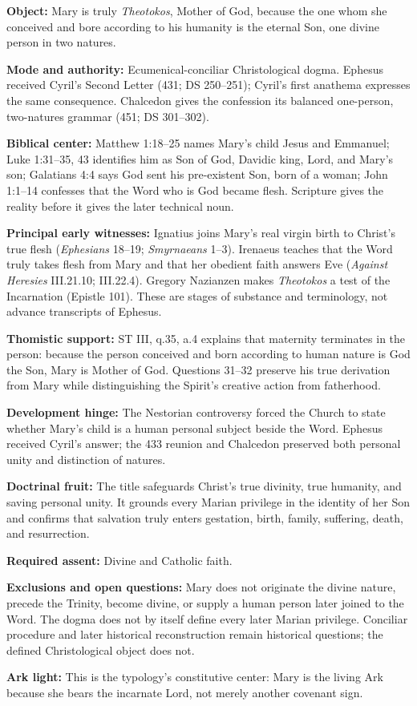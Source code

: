\begingroup
\small
\begin{studyframe}
\textbf{Object:} Mary is truly \emph{Theotokos}, Mother of God, because the
one whom she conceived and bore according to his humanity is the eternal Son,
one divine person in two natures.\par
\textbf{Mode and authority:} Ecumenical-conciliar Christological dogma.
Ephesus received Cyril's Second Letter (431; DS 250--251); Cyril's first
anathema expresses the same consequence.  Chalcedon gives the confession its
balanced one-person, two-natures grammar (451; DS 301--302).\par
\textbf{Biblical center:} Matthew 1:18--25 names Mary's child Jesus and
Emmanuel; Luke 1:31--35, 43 identifies him as Son of God, Davidic king, Lord,
and Mary's son; Galatians 4:4 says God sent his pre-existent Son, born of a
woman; John 1:1--14 confesses that the Word who is God became flesh.  Scripture
gives the reality before it gives the later technical noun.\par
\textbf{Principal early witnesses:} Ignatius joins Mary's real virgin birth
to Christ's true flesh (\emph{Ephesians} 18--19; \emph{Smyrnaeans} 1--3).
Irenaeus teaches that the Word truly takes flesh from Mary and that her obedient
faith answers Eve (\emph{Against Heresies} III.21.10; III.22.4).  Gregory
Nazianzen makes \emph{Theotokos} a test of the Incarnation (Epistle 101).
These are stages of substance and terminology, not advance transcripts of
Ephesus.\par
\textbf{Thomistic support:} ST III, q.35, a.4 explains that maternity
terminates in the person: because the person conceived and born according to
human nature is God the Son, Mary is Mother of God.  Questions 31--32 preserve
his true derivation from Mary while distinguishing the Spirit's creative
action from fatherhood.\par
\textbf{Development hinge:} The Nestorian controversy forced the Church to
state whether Mary's child is a human personal subject beside the Word.
Ephesus received Cyril's answer; the 433 reunion and Chalcedon preserved both
personal unity and distinction of natures.\par
\textbf{Doctrinal fruit:} The title safeguards Christ's true divinity, true
humanity, and saving personal unity.  It grounds every Marian privilege in the
identity of her Son and confirms that salvation truly enters gestation, birth,
family, suffering, death, and resurrection.\par
\textbf{Required assent:} Divine and Catholic faith.\par
\textbf{Exclusions and open questions:} Mary does not originate the divine
nature, precede the Trinity, become divine, or supply a human person later
joined to the Word.  The dogma does not by itself define every later Marian
privilege.  Conciliar procedure and later historical reconstruction remain
historical questions; the defined Christological object does not.\par
\textbf{Ark light:} This is the typology's constitutive center: Mary is the
living Ark because she bears the incarnate Lord, not merely another covenant
sign.
\end{studyframe}
\endgroup

